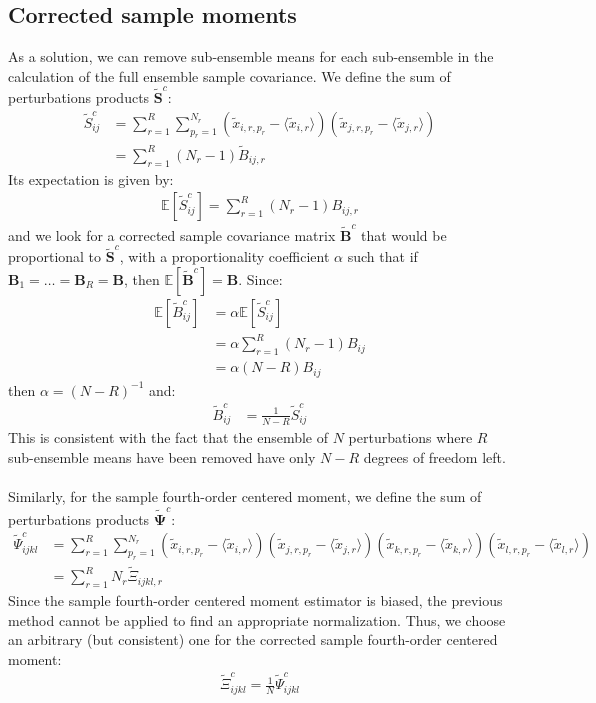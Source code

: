 \documentclass[12pt]{scrartcl}
\begin{document}
\subsection{Corrected sample moments}
As a solution, we can remove sub-ensemble means for each sub-ensemble in the calculation of the full ensemble sample covariance. We define the sum of perturbations products $\widetilde{\mathbf{S}}^c$:
\begin{align}
\widetilde{S}^c_{ij} & = \sum_{r=1}^R \sum_{p_r=1}^{N_r} \left(\widetilde{x}_{i,r,p_r} - \langle \widetilde{x}_{i,r} \rangle\right) \left(\widetilde{x}_{j,r,p_r} - \langle \widetilde{x}_{j,r} \rangle\right) \nonumber \\
& = \sum_{r=1}^R \left(N_r-1\right) \widetilde{B}_{ij,r}
\end{align}
Its expectation is given by:
\begin{align}
\mathbb{E} \left[\widetilde{S}^c_{ij}\right] = \sum_{r=1}^R \left(N_r-1\right) B_{ij,r}
\end{align}
and we look for a corrected sample covariance matrix $\widetilde{\mathbf{B}}^c$ that would be proportional to $\widetilde{\mathbf{S}}^c$, with a proportionality coefficient $\alpha$ such that if $\mathbf{B}_1 = \dots = \mathbf{B}_R = \mathbf{B}$, then $\mathbb{E} \left[\widetilde{\mathbf{B}}^c\right] = \mathbf{B}$. Since:
\begin{align}
\mathbb{E} \left[\widetilde{B}^c_{ij}\right] & = \alpha \mathbb{E} \left[\widetilde{S}^c_{ij}\right] \nonumber \\
& = \alpha \sum_{r=1}^R \left(N_r-1\right) B_{ij} \nonumber \\
& = \alpha (N-R) B_{ij}
\end{align}
then $\alpha = (N-R)^{-1}$ and:
\begin{align}
\widetilde{B}^c_{ij} & = \frac{1}{N-R} \widetilde{S}^c_{ij}
\end{align}
This is consistent with the fact that the ensemble of $N$ perturbations where $R$ sub-ensemble means have been removed have only $N-R$ degrees of freedom left.\\
$  $\\
Similarly, for the sample fourth-order centered moment, we define the sum of perturbations products $\widetilde{\boldsymbol{\Psi}}^c$:
\begin{align}
\widetilde{\Psi}^c_{ijkl} & = \sum_{r=1}^R \sum_{p_r=1}^{N_r} \left(\widetilde{x}_{i,r,p_r} - \langle \widetilde{x}_{i,r} \rangle\right) \left(\widetilde{x}_{j,r,p_r} - \langle \widetilde{x}_{j,r} \rangle\right) \left(\widetilde{x}_{k,r,p_r} - \langle \widetilde{x}_{k,r} \rangle\right) \left(\widetilde{x}_{l,r,p_r} - \langle \widetilde{x}_{l,r} \rangle\right) \nonumber \\
& = \sum_{r=1}^R N_r \widetilde{\Xi}_{ijkl,r}
\end{align}
Since the sample fourth-order centered moment estimator is biased, the previous method cannot be applied to find an appropriate normalization. Thus, we choose an arbitrary (but consistent) one for the corrected sample fourth-order centered moment:
\begin{align}
\widetilde{\Xi}^c_{ijkl} = \frac{1}{N} \widetilde{\Psi}^c_{ijkl}
\end{align}
\end{document}
